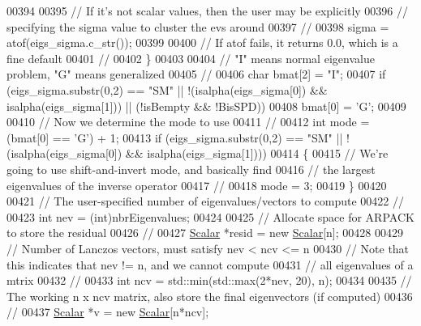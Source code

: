 \begin{DoxyCode}
00394 
00395       \textcolor{comment}{// If it's not scalar values, then the user may be explicitly}
00396       \textcolor{comment}{// specifying the sigma value to cluster the evs around}
00397       \textcolor{comment}{//}
00398       sigma = atof(eigs\_sigma.c\_str());
00399 
00400       \textcolor{comment}{// If atof fails, it returns 0.0, which is a fine default}
00401       \textcolor{comment}{//}
00402   \}
00403 
00404   \textcolor{comment}{// "I" means normal eigenvalue problem, "G" means generalized}
00405   \textcolor{comment}{//}
00406   \textcolor{keywordtype}{char} bmat[2] = \textcolor{stringliteral}{"I"};
00407   \textcolor{keywordflow}{if} (eigs\_sigma.substr(0,2) == \textcolor{stringliteral}{"SM"} || !(isalpha(eigs\_sigma[0]) && isalpha(eigs\_sigma[1])) || (!isBempty 
      && !BisSPD))
00408       bmat[0] = \textcolor{charliteral}{'G'};
00409 
00410   \textcolor{comment}{// Now we determine the mode to use}
00411   \textcolor{comment}{//}
00412   \textcolor{keywordtype}{int} mode = (bmat[0] == \textcolor{charliteral}{'G'}) + 1;
00413   \textcolor{keywordflow}{if} (eigs\_sigma.substr(0,2) == \textcolor{stringliteral}{"SM"} || !(isalpha(eigs\_sigma[0]) && isalpha(eigs\_sigma[1])))
00414   \{
00415       \textcolor{comment}{// We're going to use shift-and-invert mode, and basically find}
00416       \textcolor{comment}{// the largest eigenvalues of the inverse operator}
00417       \textcolor{comment}{//}
00418       mode = 3;
00419   \}
00420 
00421   \textcolor{comment}{// The user-specified number of eigenvalues/vectors to compute}
00422   \textcolor{comment}{//}
00423   \textcolor{keywordtype}{int} nev = (int)nbrEigenvalues;
00424 
00425   \textcolor{comment}{// Allocate space for ARPACK to store the residual}
00426   \textcolor{comment}{//}
00427   \hyperlink{class_eigen_1_1_arpack_generalized_self_adjoint_eigen_solver_ab1182405bfe87a505d4b7a8311c661ec}{Scalar} *resid = \textcolor{keyword}{new} \hyperlink{class_eigen_1_1_arpack_generalized_self_adjoint_eigen_solver_ab1182405bfe87a505d4b7a8311c661ec}{Scalar}[n];
00428 
00429   \textcolor{comment}{// Number of Lanczos vectors, must satisfy nev < ncv <= n}
00430   \textcolor{comment}{// Note that this indicates that nev != n, and we cannot compute}
00431   \textcolor{comment}{// all eigenvalues of a mtrix}
00432   \textcolor{comment}{//}
00433   \textcolor{keywordtype}{int} ncv = std::min(std::max(2*nev, 20), n);
00434 
00435   \textcolor{comment}{// The working n x ncv matrix, also store the final eigenvectors (if computed)}
00436   \textcolor{comment}{//}
00437   \hyperlink{class_eigen_1_1_arpack_generalized_self_adjoint_eigen_solver_ab1182405bfe87a505d4b7a8311c661ec}{Scalar} *v = \textcolor{keyword}{new} \hyperlink{class_eigen_1_1_arpack_generalized_self_adjoint_eigen_solver_ab1182405bfe87a505d4b7a8311c661ec}{Scalar}[n*ncv];

\end{DoxyCode}

